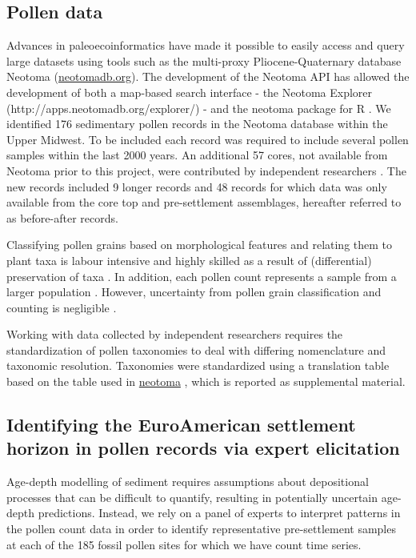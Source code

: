 \documentclass[12pt]{article}
\begin{document}
\subsection{Pollen data}

Advances in paleoecoinformatics have made it possible to easily access
and query large datasets using tools such as the multi-proxy
Pliocene-Quaternary database Neotoma (\url{neotomadb.org}). The
development of the Neotoma API has allowed the development of both a
map-based search interface - the Neotoma Explorer
(http://apps.neotomadb.org/explorer/) - and the neotoma package for R
\citep{goring2015}. We identified 176 sedimentary pollen records in
the Neotoma database within the Upper Midwest. To be included each
record was required to include several pollen samples within the last
2000 years.  An additional 57 cores, not available from Neotoma prior
to this project, were contributed by independent researchers
\citep{kujawa2015}. The new records included 9 longer records and 48
records for which data was only available from the core top and
pre-settlement assemblages, hereafter referred to as before-after
records.

Classifying pollen grains based on morphological features and relating
them to plant taxa is labour intensive and highly skilled as a result
of (differential) preservation of taxa \citep{havinga1964,
  havinga1984}. In addition, each pollen count represents a sample
from a larger population \citep{maher2012assessment,
  maher1981statistics}. However, uncertainty from pollen grain
classification and counting is negligible \citep{webb1978sensing,
  webb1978mapped}. 

Working with data collected by independent researchers requires the
standardization of pollen taxonomies to deal with differing
nomenclature and taxonomic resolution. Taxonomies were standardized
using a translation table based on the table used in \url{neotoma}
\citep{goring}, which is reported as supplemental material.

\subsection{Identifying the EuroAmerican settlement horizon in pollen records via expert elicitation}

Age-depth modelling of sediment requires assumptions about
depositional processes that can be difficult to quantify, resulting in
potentially uncertain age-depth predictions. Instead, we rely on a
panel of experts to interpret patterns in the pollen count data in
order to identify representative pre-settlement samples at each of the
185 fossil pollen sites for which we have count time series.
\end{document}
